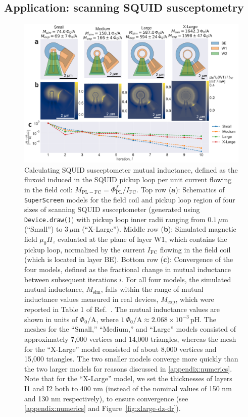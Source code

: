 \documentclass[final,3p,times,twocolumn]{elsarticle}
\newcommand{\inline}[1]{\texttt{#1}\xspace}
\newcommand{\SuperScreen}{\inline{SuperScreen}}
\newcommand{\um}{\mu\mathrm{m}}
\begin{document}
\subsection{Application: scanning SQUID susceptometry}
\label{section:examples:scanning-squid}

\begin{figure}[t]
    \centering
    \includegraphics[width=\textwidth]{examples/images/squid-mutuals.pdf}
    \caption{Calculating SQUID susceptometer mutual inductance, defined as the fluxoid induced in the SQUID pickup loop per unit current flowing in the field coil: $M_\mathrm{PL-FC}=\Phi^f_\mathrm{PL} / I_\mathrm{FC}$. Top row ({\bf a}): Schematics of \SuperScreen models for the field coil and pickup loop region of four sizes of scanning SQUID susceptometer (generated using \inline{Device.draw()}) with pickup loop inner radii ranging from $0.1\,\um$ (``Small'') to $3\,\um$ (``X-Large''). Middle row ({\bf b}): Simulated magnetic field $\mu_0H_z$ evaluated at the plane of layer W1, which contains the pickup loop, normalized by the current $I_\mathrm{FC}$ flowing in the field coil (which is located in layer BE). Bottom row ({\bf c}): Convergence of the four models, defined as the fractional change in mutual inductance between subsequent iterations $i$. For all four models, the simulated mutual inductance, $M_\mathrm{sim}$, falls within the range of mutual inductance values measured in real devices, $M_\mathrm{exp}$, which were reported in Table 1 of Ref.~\cite{Kirtley2016-zz}. The mutual inductance values are shown in units of $\Phi_0 / \mathrm{A}$, where $1\,\Phi_0 / \mathrm{A}\approx2.068\times10^{-3}\,\mathrm{pH}$. The meshes for the ``Small,'' ``Medium,'' and ``Large'' models consisted of approximately 7,000 vertices and 14,000 triangles, whereas the mesh for the ``X-Large'' model consisted of about 8,000 vertices and 15,000 triangles. The two smaller models converge more quickly than the two larger models for reasons discussed in \ref{appendix:numerics}. Note that for the ``X-Large'' model, we set the thicknesses of layers I1 and I2 both to 400 nm (instead of the nominal values of 150 nm and 130 nm respectively), to ensure convergence (see \ref{appendix:numerics} and Figure~\ref{fig:xlarge-dz-dr}).}
    \label{fig:squid-mutuals}
\end{figure}
\end{document}
